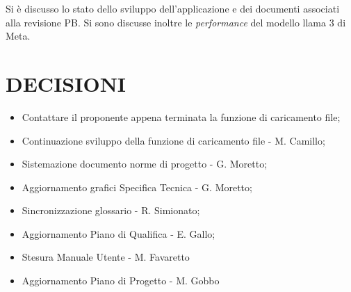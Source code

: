 \documentclass[5pt]{article}
\begin{document}
Si è discusso lo stato dello sviluppo dell'applicazione e dei documenti associati alla revisione PB. Si sono discusse inoltre le \textit{performance} del modello llama 3 di Meta.
\section{DECISIONI}
\begin{itemize}
	\item Contattare il proponente appena terminata la funzione di caricamento file;
	\
	\item Continuazione sviluppo della funzione di caricamento file - M. Camillo;
	\item Sistemazione documento norme di progetto - G. Moretto;
	\item Aggiornamento grafici Specifica Tecnica - G. Moretto;
	\item Sincronizzazione glossario - R. Simionato;
	\item Aggiornamento Piano di Qualifica - E. Gallo;
	\item Stesura Manuale Utente - M. Favaretto
	\item Aggiornamento Piano di Progetto - M. Gobbo
\end{itemize}
\end{document}
